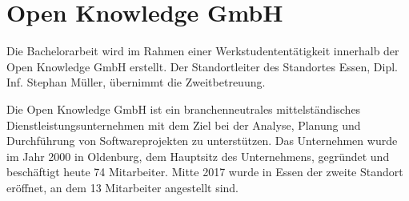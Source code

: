 




\section{Open Knowledge GmbH}


Die Bachelorarbeit wird im Rahmen einer Werkstudententätigkeit innerhalb der Open Knowledge GmbH erstellt. Der Standortleiter des Standortes Essen, Dipl. Inf. Stephan Müller, übernimmt die Zweitbetreuung.

Die Open Knowledge GmbH ist ein branchenneutrales mittelständisches Dienstleistungsunternehmen mit dem Ziel bei der Analyse, Planung und Durchführung von Softwareprojekten zu unterstützen. Das Unternehmen wurde im Jahr 2000 in Oldenburg, dem Hauptsitz des Unternehmens, gegründet und beschäftigt heute 74 Mitarbeiter. Mitte 2017 wurde in Essen der zweite Standort eröffnet, an dem 13 Mitarbeiter angestellt sind.

